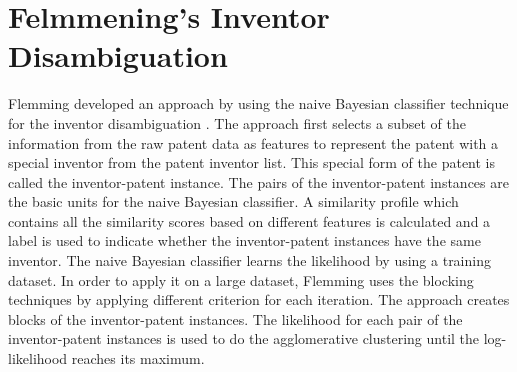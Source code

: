 \section{Felmmening's Inventor Disambiguation}
Flemming developed an approach by using the naive Bayesian classifier technique for the inventor disambiguation \cite{RePEc:eee:respol:v:43:y:2014:i:6:p:941-955}. The approach first selects a subset of the information from the raw patent data as features to represent the patent with a special inventor from the patent inventor list. This special form of the patent is called the inventor-patent instance. The pairs of the inventor-patent instances are the basic units for the naive Bayesian classifier. A similarity profile which contains all the similarity scores based on different features is calculated and a label is used to indicate whether the inventor-patent instances have the same inventor. The naive Bayesian classifier learns the likelihood by using a training dataset. In order to apply it on a large dataset, Flemming uses the blocking techniques by applying different criterion for each iteration. The approach creates blocks of the inventor-patent instances. The likelihood for each pair of the inventor-patent instances is used to do the agglomerative clustering until the log-likelihood reaches its maximum. 

